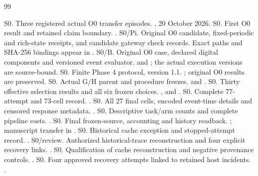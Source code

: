\documentclass[10pt]{article}
\begin{document}
\begin{thebibliography}{99}
\footnotesize\raggedright
\setlength{\itemsep}{1pt}
\setlength{\parsep}{0pt}
\setlength{\parskip}{0pt}
 S0. Three registered actual O0 transfer episodes.
, 20 October 2026.
 S0. First O0 result and retained claim boundary.
.
 S0/Pi. Original O0 candidate, fixed-periodic and rich-state
 receipts, and candidate gateway check records.
Exact paths and SHA-256 bindings appear in .
 S0/B. Original O0 case, declared digital components and
versioned event evaluator.  and
; the actual execution versions are source-bound.
 S0. Finite Phase 4 protocol, version 1.1.
; original O0 results are preserved.
 S0. Actual G/H parent and procedure freezes.
 and .
 S0. Thirty effective selection results and all six frozen
choices. ,  and
.
 S0. Complete 77-attempt and 73-cell record.
.
 S0. All 27 final cells, encoded event-time details and censored
response metadata. .
 S0. Descriptive task/arm counts and complete pipeline costs.
.
 S0. Final frozen-source, accounting and history readback.
; manuscript transfer in .
 S0. Historical cache exception and stopped-attempt record.
.
 S0/review. Authorized historical-trace reconstruction
and four explicit recovery links. .
 S0. Qualification of cache reconstruction and negative
provenance controls. .
 S0. Four approved recovery attempts linked to retained host
incidents. .
\end{thebibliography}
\end{document}
